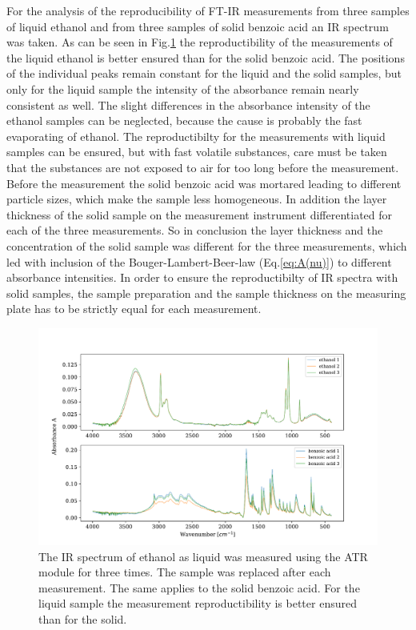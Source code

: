 \documentclass[a4paper,abstracton]{article}	                       %
\begin{document}
For the analysis of the reproducibility of FT-IR measurements from three samples of liquid ethanol and from three samples of solid benzoic acid an IR spectrum was taken. As can be seen in Fig.\ref{fig:TeilB} the reproductibility of the measurements of the liquid ethanol is better ensured than for the solid benzoic acid. The positions of the individual peaks remain constant for the liquid and the solid samples, but only for the liquid sample the intensity of the absorbance remain nearly consistent as well. The slight differences in the absorbance intensity of the ethanol samples can be neglected, because the cause is probably the fast evaporating of ethanol. The reproductibilty for the measurements with liquid samples can be ensured, but with fast volatile substances, care must be taken that the substances are not exposed to air for too long before the measurement. Before the measurement the solid benzoic acid was mortared leading to different particle sizes, which make the sample less homogeneous. In addition the layer thickness of the solid sample on the measurement instrument differentiated for each of the three measurements. So in conclusion the layer thickness and the concentration of the solid sample was different for the three measurements, which led with inclusion of the Bouger-Lambert-Beer-law (Eq.\ref{eq:A(nu)}) to different absorbance intensities. In order to ensure the reproductibilty of IR spectra with solid samples, the sample preparation and the sample thickness on the measuring plate has to be strictly equal for each measurement.

\begin{figure}[H]
\centering
 \includegraphics[width=\textwidth] {TeilB.pdf}
\caption{\label{fig:TeilB}The IR spectrum of ethanol as liquid was measured using the ATR module for three times. The sample was replaced after each measurement. The same applies to the solid benzoic acid. For the liquid sample the measurement reproductibility is better ensured than for the solid.} 
\end{figure}
\end{document}
